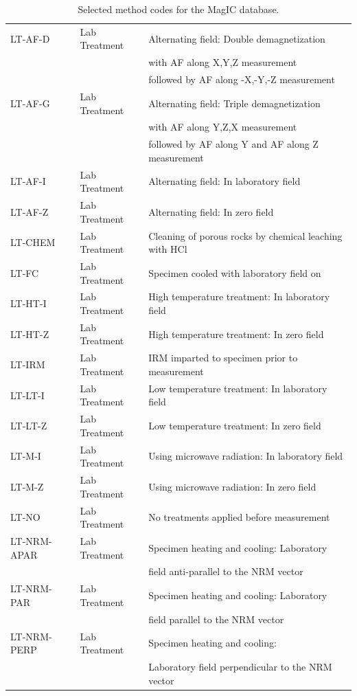 \documentclass[11pt]{book}
\begin{document}
{{{  \begin{table}[h]
  \caption{Selected method codes for the MagIC database.}
  \label{tab:meth}
   \begin{tabular}{lll} 
  \hline
  LT-AF-D & Lab Treatment & Alternating field: Double demagnetization\\
  && with AF along X,Y,Z measurement \\
 && followed by AF along -X,-Y,-Z measurement\\
LT-AF-G & Lab Treatment & Alternating field: Triple demagnetization\\ 
&& with AF along Y,Z,X measurement\\
&& followed by AF along Y and AF along Z measurement\\
LT-AF-I & Lab Treatment & Alternating field: In laboratory field\\
LT-AF-Z & Lab Treatment & Alternating field: In zero field\\
LT-CHEM & Lab Treatment & Cleaning of porous rocks by chemical leaching with HCl\\
LT-FC & Lab Treatment & Specimen cooled with laboratory field on\\
LT-HT-I & Lab Treatment & High temperature treatment: In laboratory field\\
LT-HT-Z & Lab Treatment & High temperature treatment: In zero field\\
LT-IRM & Lab Treatment & IRM imparted to specimen prior to measurement\\
LT-LT-I & Lab Treatment & Low temperature treatment: In laboratory field\\
LT-LT-Z & Lab Treatment & Low temperature treatment: In zero field\\
LT-M-I & Lab Treatment & Using microwave radiation: In laboratory field\\
LT-M-Z & Lab Treatment & Using microwave radiation: In zero field\\
LT-NO & Lab Treatment & No treatments applied before measurement\\
LT-NRM-APAR & Lab Treatment & Specimen heating and cooling: Laboratory \\
&&field anti-parallel to the NRM vector\\
LT-NRM-PAR & Lab Treatment & Specimen heating and cooling: Laboratory \\
&&field parallel to the NRM vector\\
LT-NRM-PERP & Lab Treatment & Specimen heating and cooling: \\
&&Laboratory field perpendicular to the NRM vector\\

\end{tabular}
\end{table}}}}
\end{document}
